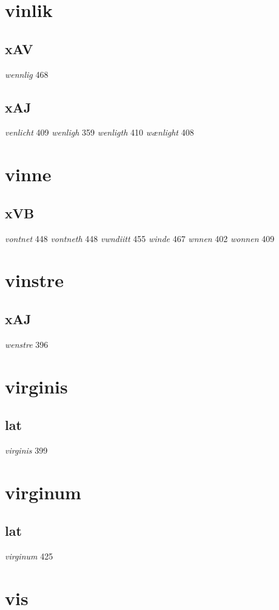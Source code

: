 \documentclass[a4paper,twocolumn]{article}
\begin{document}
\section{vinlik}
\label{sec:orgceb69a6}
\subsection{xAV}
\label{sec:org12b656e}
\emph{wennlig} 468 
\subsection{xAJ}
\label{sec:org991fdaa}
\emph{venlicht} 409 \emph{wenligh} 359 \emph{wenligth} 410 \emph{wænlight} 408 
\section{vinne}
\label{sec:org7dd0f69}
\subsection{xVB}
\label{sec:orgf7653e1}
\emph{vontnet} 448 \emph{vontneth} 448 \emph{vwndiitt} 455 \emph{winde} 467 \emph{wnnen} 402 \emph{wonnen} 409 
\section{vinstre}
\label{sec:orgf1844a4}
\subsection{xAJ}
\label{sec:org6709026}
\emph{wenstre} 396 
\section{virginis}
\label{sec:orgf2c15bb}
\subsection{lat}
\label{sec:orgb02ce62}
\emph{virginis} 399 
\section{virginum}
\label{sec:org26f82d3}
\subsection{lat}
\label{sec:orgea62547}
\emph{virginum} 425 
\section{vis}
\label{sec:org010972e}
\end{document}
